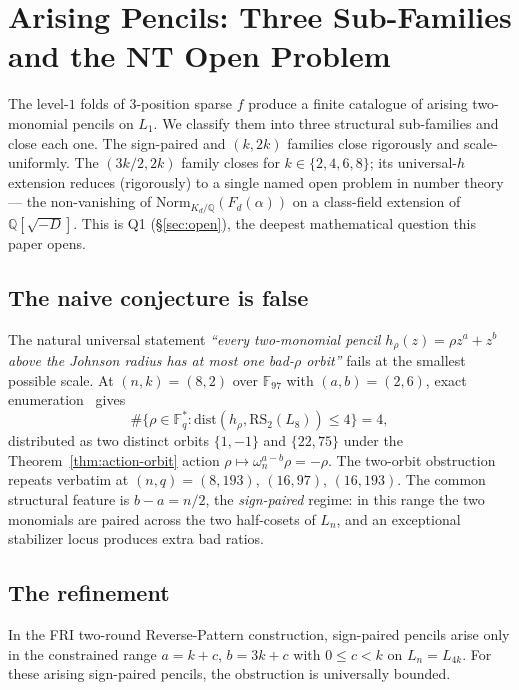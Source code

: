 \documentclass[11pt]{article}
\theoremstyle{definition}
\theoremstyle{remark}
\newcommand{\FF}{\mathbb{F}}
\newcommand{\RS}{\mathrm{RS}}
\newcommand{\dist}{\mathrm{dist}}
\begin{document}
\section{Arising Pencils: Three Sub-Families and the NT Open Problem}
\label{sec:conjE}

\noindent The level-$1$ folds of $3$-position sparse $f$ produce a
finite catalogue of arising two-monomial pencils on $L_1$. We
classify them into three structural sub-families and close each
one. The sign-paired and $(k, 2k)$ families close rigorously and
scale-uniformly. The $(3k/2, 2k)$ family closes for $k \in \{2, 4, 6, 8\}$;
its universal-$h$ extension reduces (rigorously) to a single named
open problem in number theory --- the non-vanishing of
$\mathrm{Norm}_{K_d/\mathbb{Q}}(F_d(\alpha))$ on a class-field
extension of $\mathbb{Q}[\sqrt{-D}]$. This is Q1
(\S\ref{sec:open}), the deepest mathematical question this paper
opens.

\subsection{The naive conjecture is false}

The natural universal statement \emph{``every two-monomial pencil $h_\rho(z)
= \rho z^a + z^b$ above the Johnson radius has at most one bad-$\rho$
orbit''} fails at the smallest possible scale. At $(n, k) = (8, 2)$ over
$\FF_{97}$ with $(a, b) = (2, 6)$, exact enumeration~\cite{CompanionRepo}
gives
\[
 \#\{\rho \in \FF_q^* : \dist(h_\rho, \RS_2(L_8)) \leq 4\} = 4,
\]
distributed as two distinct orbits $\{1, -1\}$ and $\{22, 75\}$ under the
Theorem~\ref{thm:action-orbit} action $\rho \mapsto \omega_n^{a-b} \rho =
-\rho$. The two-orbit obstruction repeats verbatim at $(n, q) = (8, 193)$,
$(16, 97)$, $(16, 193)$. The common structural feature is
$b - a = n/2$, the \emph{sign-paired} regime: in this range the two
monomials are paired across the two half-cosets of $L_n$, and an exceptional
stabilizer locus produces extra bad ratios.

\subsection{The refinement}

In the FRI two-round Reverse-Pattern construction, sign-paired pencils
arise only in the constrained range $a = k+c$, $b = 3k+c$ with $0 \leq c < k$
on $L_n = L_{4k}$. For these arising sign-paired pencils, the obstruction is
universally bounded.
\end{document}
